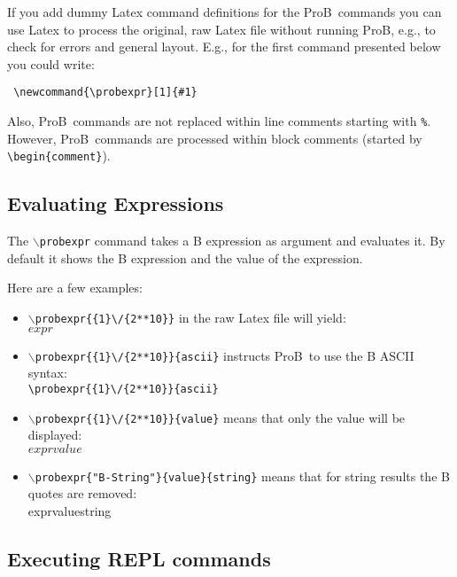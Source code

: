 \documentclass[final]{llncs}
\newcommand{\prob}{{\sc ProB}}
\newcommand{\probexpr}[2][silent]{expr} %
\begin{document}
If you add dummy Latex command definitions for the \prob\ commands you can use Latex to process the
original, raw Latex file without running \prob, e.g., to check for errors and general layout.
E.g., for the first command presented below you could write:

\begin{verbatim}
 \newcommand{\probexpr}[1]{#1}
\end{verbatim}

Also, \prob\ commands are not replaced within line comments starting with \verb+%+.
However, \prob\ commands are processed within block comments (started by \verb+\begin{comment}+).


\subsection{Evaluating Expressions}

\newcommand{\probCMD}[1]{{\tt $\backslash$prob#1}}

The {\tt \probCMD{expr}} command takes a B expression as argument and evaluates it.
By default it shows the B expression and the value of the expression.

Here are a few examples:
\begin{itemize}
   \item  \probCMD{expr}\verb+{{1}\/{2**10}}+ in the raw Latex file will yield:\\
        {$\probexpr{{1}\/{2**10}}$}
    \item   \probCMD{expr}\verb+{{1}\/{2**10}}{ascii}+  instructs \prob\ to use the B ASCII syntax:\\
        {\tt \verb+\probexpr{{1}\/{2**10}}{ascii}+}
    \item    \probCMD{expr}\verb+{{1}\/{2**10}}{value}+  means that only the value will be displayed:\\
        $\probexpr{{1}\/{2**10}}{value}$
    \item    \probCMD{expr}\verb+{"B-String"}{value}{string}+  means that for string results the B quotes are removed:\\
        \probexpr{"B-String"}{value}{string}
\end{itemize}


\subsection{Executing REPL commands}
\end{document}
